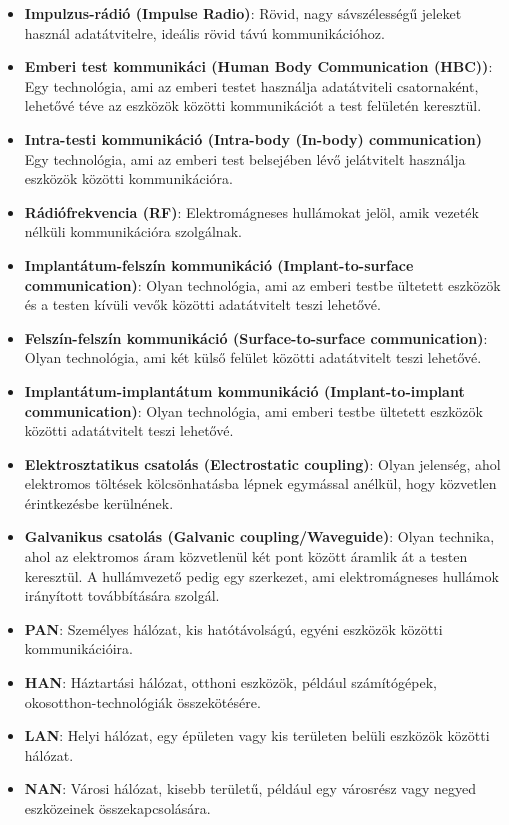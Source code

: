\begin{itemize}
    \item \textbf{Impulzus-rádió (Impulse Radio)}: Rövid, nagy sávszélességű jeleket használ adatátvitelre, ideális rövid távú kommunikációhoz.
    \item \textbf{Emberi test kommunikáci (Human Body Communication (HBC))}: Egy technológia, ami az emberi testet használja adatátviteli csatornaként, lehetővé téve az eszközök közötti kommunikációt a test felületén keresztül.
    \item \textbf{Intra-testi kommunikáció (Intra-body (In-body) communication)} Egy technológia, ami az emberi test belsejében lévő jelátvitelt használja eszközök közötti kommunikációra.
    \item \textbf{Rádiófrekvencia (RF)}: Elektromágneses hullámokat jelöl, amik vezeték nélküli kommunikációra szolgálnak.
    \item \textbf{Implantátum-felszín kommunikáció (Implant-to-surface communication)}: Olyan technológia, ami az emberi testbe ültetett eszközök és a testen kívüli vevők közötti adatátvitelt teszi lehetővé.
    \item \textbf{Felszín-felszín kommunikáció (Surface-to-surface communication)}: Olyan technológia, ami két külső felület közötti adatátvitelt teszi lehetővé.
    \item \textbf{Implantátum-implantátum kommunikáció (Implant-to-implant communication)}: Olyan technológia, ami emberi testbe ültetett eszközök közötti adatátvitelt teszi lehetővé.
    \item \textbf{Elektrosztatikus csatolás (Electrostatic coupling)}: Olyan jelenség, ahol elektromos töltések kölcsönhatásba lépnek egymással anélkül, hogy közvetlen érintkezésbe kerülnének.
    \item \textbf{Galvanikus csatolás (Galvanic coupling/Waveguide)}: Olyan technika, ahol az elektromos áram közvetlenül két pont között áramlik át a testen keresztül. A hullámvezető pedig egy szerkezet, ami elektromágneses hullámok irányított továbbítására szolgál.
    \item \textbf{PAN}: Személyes hálózat, kis hatótávolságú, egyéni eszközök közötti kommunikációira.
    \item \textbf{HAN}: Háztartási hálózat, otthoni eszközök, például számítógépek, okosotthon-technológiák összekötésére.
    \item \textbf{LAN}: Helyi hálózat, egy épületen vagy kis területen belüli eszközök közötti hálózat.
    \item \textbf{NAN}: Városi hálózat, kisebb területű, például egy városrész vagy negyed eszközeinek összekapcsolására.

\end{itemize}
